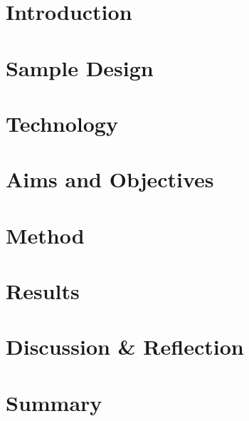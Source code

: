 \section{Introduction}



\section{Sample Design}



\section{Technology}



\section{Aims and Objectives}



\section{Method}



\section{Results}



\section{Discussion \& Reflection}



\section{Summary}

